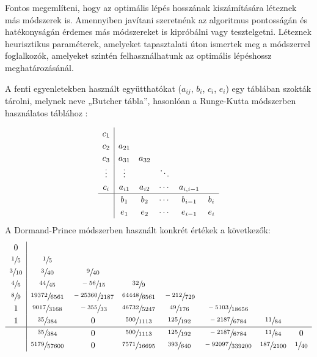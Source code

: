 Fontos megemlíteni, hogy az optimális lépés hosszának kiszámítására léteznek más módszerek is. Amennyiben javítani szeretnénk az algoritmus pontosságán és hatékonyságán érdemes más módszereket is kipróbálni vagy tesztelgetni. Léteznek heurisztikus paraméterek, amelyeket tapasztalati úton ismertek meg a módszerrel foglalkozók, amelyeket szintén felhasználhatunk az optimális lépéshossz meghatározásánál.

A fenti egyenletekben használt együtthatókat ($ a_{ij} $, $ b_{i} $, $ c_{i} $, $ e_{i} $) egy táblában szokták tárolni, melynek neve „Butcher tábla”, hasonlóan a Runge-Kutta módszerben használatos táblához \cite{RungeKuttaFormula}:

\[
\renewcommand\arraystretch{1.2}
\begin{array}
{c|ccccc}
c_{1} \\
c_{2} & a_{21}\\
c_{3} & a_{31} & a_{32} \\
\vdots & \vdots & & \ddots \\
c_{i} & a_{i1} & a_{i2} & \cdots & a_{i,i-1}\\
\hline
& b_{1} & b_{2} & \cdots & b_{i-1} & b_{i} \\
& e_{1} & e_{2} & \cdots & e_{i-1} & e_{i}
\end{array}
\]
A Dormand-Prince módszerben használt konkrét értékek a következők:
\[
\renewcommand\arraystretch{1.2}
\begin{array}
{c|ccccccc}
0\\
\sfrac{1}{5} & \sfrac{1}{5}\\
\sfrac{3}{10} & \sfrac{3}{40} & \sfrac{9}{40} \\
\sfrac{4}{5} & \sfrac{44}{45} & \sfrac{-56}{15} & \sfrac{32}{9}\\
\sfrac{8}{9} & \sfrac{19372}{6561} & \sfrac{-25360}{2187} & \sfrac{64448}{6561} & \sfrac{-212}{729}\\
1 & \sfrac{9017}{3168} & \sfrac{-355}{33} & \sfrac{46732}{5247} & \sfrac{49}{176} & \sfrac{-5103}{18656}\\
1 & \sfrac{35}{384} & 0 & \sfrac{500}{1113} & \sfrac{125}{192} & \sfrac{-2187}{6784} & \sfrac{11}{84}\\
\hline
& \sfrac{35}{384} & 0 & \sfrac{500}{1113} & \sfrac{125}{192} & \sfrac{-2187}{6784} & \sfrac{11}{84} & 0\\
& \sfrac{5179}{57600} & 0 & \sfrac{7571}{16695} & \sfrac{393}{640} & \sfrac{-92097}{339200} & \sfrac{187}{2100} & \sfrac{1}{40}
\end{array}
\]


